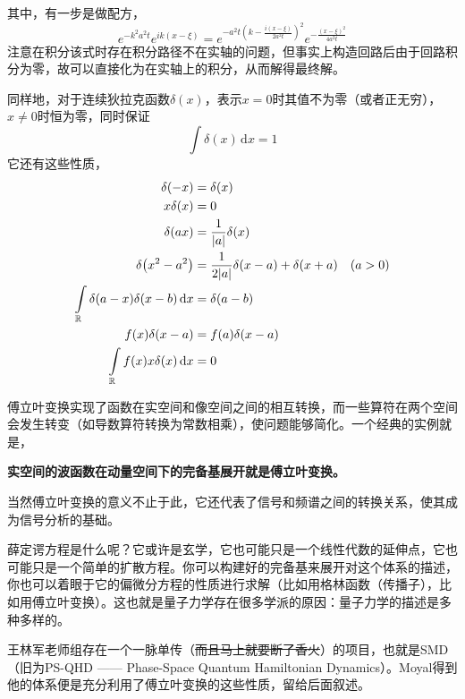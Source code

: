 \documentclass[12pt,a4paper,openany,twoside]{book}
\numberwithin{equation}{section}
\newcommand{\ud}{\mathrm{d}}
\begin{document}
        其中，有一步是做配方，
        \begin{equation*}
          e^{-k^2a^2 t} e^{ik (x-\xi)} = e^{-a^2 t (k-\frac{i (x-\xi)}{2a^2 t})^2} e^{-\frac{(x-\xi)^2}{4a^2 t}}
        \end{equation*} 
        注意在积分该式时存在积分路径不在实轴的问题，但事实上构造回路后由于回路积分为零，故可以直接化为在实轴上的积分，从而解得最终解。

        同样地，对于连续狄拉克函数$\delta(x)$，表示$x=0$时其值不为零（或者正无穷），$x\neq 0$时恒为零，同时保证
        \begin{equation}
          \int \delta(x) \, \ud x = 1 
        \end{equation}
        它还有这些性质，
        \begin{align}
          \delta\qty(-x)&=\delta\qty(x)\\
          x\delta\qty(x)&=0\\
          \delta\qty(ax)&=\frac{1}{\abs{a}}\delta\qty(x)\\
          \delta\qty(x^2-a^2)&=\frac{1}{2\abs{a}}{\delta\qty(x-a)+\delta\qty(x+a)}\quad\qty(a>0)\\
          \int\limits_\mathbb{R}{\delta\qty(a-x)\delta\qty(x-b)\dd{x}}&=\delta\qty(a-b)\\
          f\qty(x)\delta\qty(x-a)&=f\qty(a)\delta\qty(x-a)\\
          \int\limits_\mathbb{R}{f\qty(x)x\delta\qty(x)\dd{x}}&=0
        \end{align}

        傅立叶变换实现了函数在实空间和像空间之间的相互转换，而一些算符在两个空间会发生转变（如导数算符转换为常数相乘），使问题能够简化。一个经典的实例就是，
        \begin{center}
          \textbf{实空间的波函数在动量空间下的完备基展开就是傅立叶变换。}
        \end{center}
        当然傅立叶变换的意义不止于此，它还代表了信号和频谱之间的转换关系，使其成为信号分析的基础。

        薛定谔方程是什么呢？它或许是玄学，它也可能只是一个线性代数的延伸点，它也可能只是一个简单的扩散方程。你可以构建好的完备基来展开对这个体系的描述，你也可以着眼于它的偏微分方程的性质进行求解（比如用格林函数（传播子），比如用傅立叶变换）。这也就是量子力学存在很多学派的原因：量子力学的描述是多种多样的。

        王林军老师组存在一个一脉单传（\sout{而且马上就要断了香火}）的项目，也就是SMD（旧为PS-QHD —— Phase-Space Quantum Hamiltonian Dynamics）。Moyal得到他的体系便是充分利用了傅立叶变换的这些性质，留给后面叙述。
\end{document}
